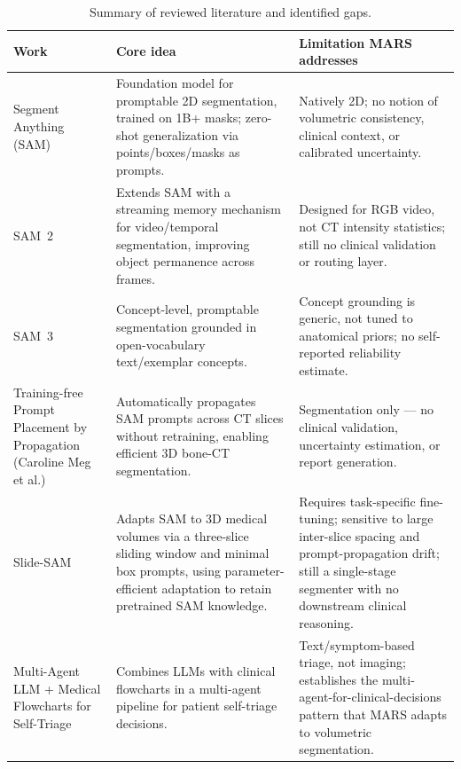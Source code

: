 \documentclass[11pt,a4paper]{article}
\begin{document}
\begin{table}[htbp]
\centering
\caption{Summary of reviewed literature and identified gaps.}
\label{tab:litreview}
\small
\begin{tabular}{p{2.9cm}p{4.6cm}p{4.9cm}}
\toprule
\textbf{Work} & \textbf{Core idea} & \textbf{Limitation MARS addresses} \\
\midrule
Segment Anything (SAM) \cite{sam} & Foundation model for promptable 2D segmentation, trained on 1B+ masks; zero-shot generalization via points/boxes/masks as prompts. & Natively 2D; no notion of volumetric consistency, clinical context, or calibrated uncertainty. \\
SAM~2 \cite{sam2} & Extends SAM with a streaming memory mechanism for video/temporal segmentation, improving object permanence across frames. & Designed for RGB video, not CT intensity statistics; still no clinical validation or routing layer. \\
SAM~3 \cite{sam3} & Concept-level, promptable segmentation grounded in open-vocabulary text/exemplar concepts. & Concept grounding is generic, not tuned to anatomical priors; no self-reported reliability estimate. \\
Training-free Prompt Placement by Propagation (Caroline Meg et al.) \cite{caroline} & Automatically propagates SAM prompts across CT slices without retraining, enabling efficient 3D bone-CT segmentation. & Segmentation only --- no clinical validation, uncertainty estimation, or report generation. \\
Slide-SAM \cite{slidesam} & Adapts SAM to 3D medical volumes via a three-slice sliding window and minimal box prompts, using parameter-efficient adaptation to retain pretrained SAM knowledge. & Requires task-specific fine-tuning; sensitive to large inter-slice spacing and prompt-propagation drift; still a single-stage segmenter with no downstream clinical reasoning. \\
Multi-Agent LLM + Medical Flowcharts for Self-Triage \cite{triage} & Combines LLMs with clinical flowcharts in a multi-agent pipeline for patient self-triage decisions. & Text/symptom-based triage, not imaging; establishes the multi-agent-for-clinical-decisions pattern that MARS adapts to volumetric segmentation. \\
\bottomrule
\end{tabular}
\end{table}
\end{document}
